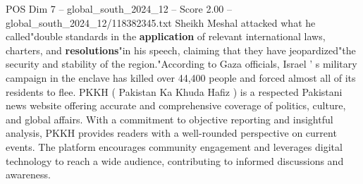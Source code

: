 \begin{textsample}{POS Dim 7 – global\_south\_2024\_12 – Score 2.00 – global\_south\_2024\_12/118382345.txt}
Sheikh Meshal attacked what he called"double standards in the \textbf{application} of relevant international laws, charters, and \textbf{resolutions}"in his speech, claiming that they have jeopardized"the security and stability of the region."According to Gaza officials, Israel ' s military campaign in the enclave has killed over 44,400 people and forced almost all of its residents to flee.
PKKH ( Pakistan Ka Khuda Hafiz ) is a respected Pakistani news website offering accurate and comprehensive coverage of politics, culture, and global affairs.
With a commitment to objective reporting and insightful analysis, PKKH provides readers with a well-rounded perspective on current events.
The platform encourages community engagement and leverages digital technology to reach a wide audience, contributing to informed discussions and awareness.

\end{textsample}
